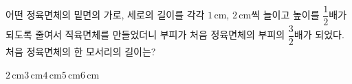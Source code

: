 어떤 정육면체의 밑면의 가로, 세로의 길이를 각각 $1\,\mathrm{cm}$, $2\,\mathrm{cm}$씩 늘이고 높이를 $\dfrac{1}{2}$배가 되도록 줄여서 직육면체를 만들었더니 부피가 처음 정육면체의 부피의 $\dfrac{3}{2}$배가 되었다. 처음 정육면체의 한 모서리의 길이는?
\begin{choices32}{$2\,\mathrm{cm}$}{$3\,\mathrm{cm}$}{$4\,\mathrm{cm}$}{$5\,\mathrm{cm}$}{$6\,\mathrm{cm}$}\end{choices32}
